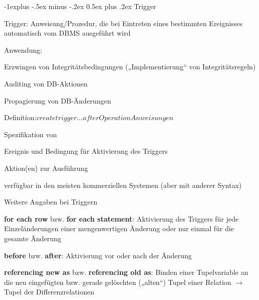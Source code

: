 \documentclass[a4paper]{article}
\makeatletter
\renewcommand{\subsection}{\@startsection{subsection}{2}{0mm}%
                                {-1explus -.5ex minus -.2ex}%
                                {0.5ex plus .2ex}%
                                {\normalfont\normalsize\bfseries}}
\makeatother
\begin{document}
\begin{multicols}{3}
\begin{itemize*}
        \subsection{Trigger}
        \begin{itemize*}
            \item Trigger: Anweisung/Prozedur, die bei Eintreten eines bestimmten Ereignisses automatisch vom DBMS ausgeführt wird
            \item Anwendung:
            \begin{itemize*}
                \item Erzwingen von Integritätsbedingungen („Implementierung“ von Integritätsregeln)
                \item Auditing von DB-Aktionen
                \item Propagierung von DB-Änderungen
            \end{itemize*}
            \item Definition:$create trigger ...  after Operation  Anweisungen$
            \item Spezifikation von
            \begin{itemize*}
                \item Ereignis und Bedingung für Aktivierung des Triggers
                \item Aktion(en) zur Ausführung
            \end{itemize*}
            \item verfügbar in den meisten kommerziellen Systemen (aber mit anderer Syntax)
            \item Weitere Angaben bei Triggern
            \begin{itemize*}
                \item \textbf{for each row} bzw. \textbf{for each statement}: Aktivierung des Triggers für jede Einzeländerungen einer mengenwertigen Änderung oder nur einmal für die gesamte Änderung
                \item \textbf{before} bzw. \textbf{after}: Aktivierung vor oder nach der Änderung
                \item \textbf{referencing new as} bzw. \textbf{referencing old as}: Binden einer Tupelvariable an die neu eingefügten bzw. gerade gelöschten („alten“) Tupel einer Relation $\rightarrow$ Tupel der Differenzrelationen
            \end{itemize*}
        \end{itemize*}


\end{itemize*}
\end{multicols}
\end{document}
